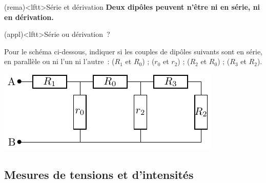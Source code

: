 \documentclass[../../main/main.tex]{subfiles}
\begin{document}
\begin{tcb}[label=rema:serdiv, halign=center](rema)<lftt>{Série et dérivation}
	\textbf{Deux dipôles peuvent n'être ni en série, ni en dérivation.}
\end{tcb}
\begin{tcb*}[label=exer:serdiv](appl)<lftt>{Série ou dérivation~?}
	\begin{minipage}{0.65\linewidth}
		Pour le schéma ci-dessous, indiquer si les couples de dipôles suivants
		sont en série, en parallèle ou ni l'un ni l'autre~: ($R_1$ et $R_0$) ;
		($r_0$ et $r_2$) ; ($R_2$ et $R_0$) ; ($R_3$ et $R_2$).
	\end{minipage}
	\begin{minipage}{0.35\linewidth}
		\begin{center}
			\includegraphics[width=\linewidth]{exer_serdiv}
		\end{center}
	\end{minipage}
	\tcblower
\end{tcb*}

\subsection{Mesures de tensions et d'intensités}
\end{document}
